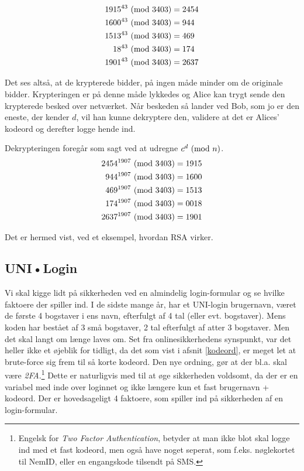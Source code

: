 \begin{eks}
    \begin{align*}
        1915^{43} \ (\mathrm{mod}\ 3403) &= 2454\\
        1600^{43} \ (\mathrm{mod}\ 3403) &= 944\\
        1513^{43} \ (\mathrm{mod}\ 3403) &= 469\\
        18^{43} \ (\mathrm{mod}\ 3403)   &= 174\\
        1901^{43} \ (\mathrm{mod}\ 3403) &= 2637\\
    \end{align*}

    Det ses altså, at de krypterede bidder, på ingen måde minder om de originale bidder.
    Krypteringen er på denne måde lykkedes og Alice kan trygt sende den krypterede besked over netværket.
    Når beskeden så lander ved Bob, som jo er den eneste, der kender \(d\), vil han kunne dekryptere den, validere at det er Alices' kodeord og derefter logge hende ind.

    Dekrypteringen foregår som sagt ved at udregne \(c^d \ (\mathrm{mod}\ n)\).
    \begin{align*}
        2454^{1907} \ (\mathrm{mod}\ 3403) &= 1915\\
        944^{1907} \ (\mathrm{mod}\ 3403)  &= 1600\\
        469^{1907} \ (\mathrm{mod}\ 3403)  &= 1513\\
        174^{1907} \ (\mathrm{mod}\ 3403)  &= 0018\\
        2637^{1907} \ (\mathrm{mod}\ 3403) &= 1901
    \end{align*}

    Det er hermed vist, ved et eksempel, hvordan RSA virker.
\end{eks}



\subsection{UNI•Login}
Vi skal kigge lidt på sikkerheden ved en almindelig login-formular og se hvilke faktoere der spiller ind.
I de sidste mange år, har et UNI-login brugernavn, været de første 4 bogstaver i ens navn, efterfulgt af 4 tal (eller evt. bogstaver).
Mens koden har bestået af 3 små bogstaver, 2 tal efterfulgt af atter 3 bogstaver.
Men det skal langt om længe laves om. \cite{unilogin}
Set fra onlinesikkerhedens synspunkt, var det heller ikke et øjeblik for tidligt, da det som vist i afsnit \ref{kodeord}, er meget let at brute-force sig frem til så korte kodeord.
Den nye ordning, gør at der bl.a. skal være \emph{2FA}.\footnote{Engelsk for \emph{Two Factor Authentication}, betyder at man ikke blot skal logge ind med et fast kodeord, men også have noget seperat, som f.eks. nøglekortet til NemID, eller en engangskode tilsendt på SMS.}
Dette er naturligvis med til at øge sikkerheden voldsomt, da der er en variabel med inde over loginnet og ikke længere kun et fast brugernavn + kodeord.
Der er hovedsageligt 4 faktoere, som spiller ind på sikkerheden af en login-formular.

